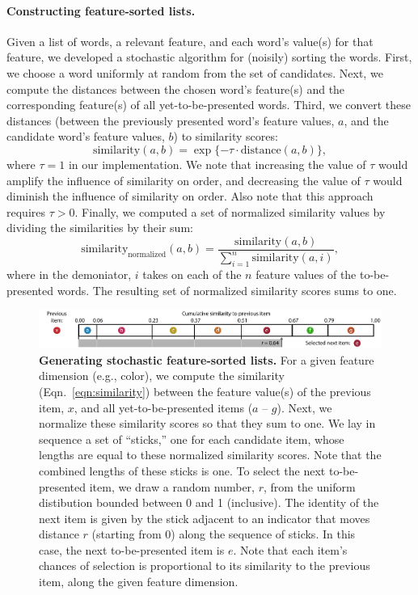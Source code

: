 \documentclass[11pt]{article}
\begin{document}
\paragraph{Constructing feature-sorted lists.} Given a list of words, a
relevant feature, and each word's value(s) for that feature, we developed a
stochastic algorithm for (noisily) sorting the words. First, we choose a word
uniformly at random from the set of candidates. Next, we compute the distances
between the chosen word's feature(s) and the corresponding feature(s) of all
yet-to-be-presented words. Third, we convert these distances (between the
previously presented word's feature values, $a$, and the candidate word's
feature values, $b$) to similarity scores: \begin{equation}
\mathrm{similarity}(a, b) = \exp\{-\tau \cdot \mathrm{distance}(a, b)\},
\label{eqn:similarity} \end{equation} where $\tau = 1$ in our implementation.
We note that increasing the value of $\tau$ would amplify the influence of
similarity on order, and decreasing the value of $\tau$ would diminish the
influence of similarity on order. Also note that this approach requires $\tau >
0$. Finally, we computed a set of normalized similarity values by dividing the
similarities by their sum: \begin{equation}
\mathrm{similarity}_{\mathrm{normalized}}(a, b) = \frac{\mathrm{similarity}(a,
b)}{\sum_{i=1}^n \mathrm{similarity}(a, i)}, \end{equation} where in the
demoniator, $i$ takes on each of the $n$ feature values of the to-be-presented
words. The resulting set of normalized similarity scores sums to one.

\begin{figure}[tp]
    \centering
        \includegraphics[width=\textwidth]{figures/stick}
        
\caption{\textbf{Generating stochastic feature-sorted lists.} For a given
feature dimension (e.g., color), we compute the similarity
(Eqn.~\ref{eqn:similarity}) between the feature value(s) of the previous item,
$x$, and all yet-to-be-presented items ($a$ -- $g$). Next, we normalize these
similarity scores so that they sum to one. We lay in sequence a set of
``sticks,'' one for each candidate item, whose lengths are equal to these
normalized similarity scores. Note that the combined lengths of these sticks is
one. To select the next to-be-presented item, we draw a random number, $r$,
from the uniform distibution bounded between 0 and 1 (inclusive). The identity
of the next item is given by the stick adjacent to an indicator that moves
distance $r$ (starting from 0) along the sequence of sticks. In this case, the
next to-be-presented item is $e$. Note that each item's chances of selection is
proportional to its similarity to the previous item, along the given feature
dimension.} \label{fig:stick} 
\end{figure}
\end{document}
